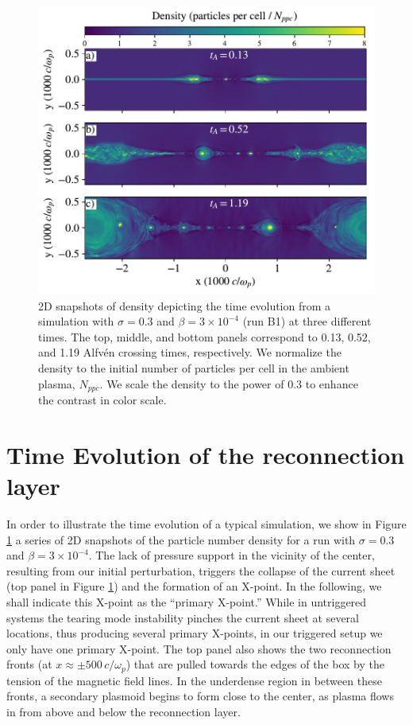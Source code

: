 \begin{figure}[!h]
\includegraphics[width=1.0\linewidth]{testing_threeplot.pdf}
\caption{2D snapshots of density depicting the time evolution from a simulation with $\sigma=0.3$ and $\beta=3\times 10^{-4}$ (run B1) at three different times.  The top, middle, and bottom panels correspond to 0.13, 0.52, and 1.19 Alfv\'en crossing times, respectively.  We normalize the density to the initial number of particles per cell in the ambient plasma, $N_{ppc}$.  We scale the density to the power of $0.3$ to enhance the contrast in color scale.}
\label{lowbeta_threeplot}
\end{figure}

\section{Time Evolution of the reconnection layer}\label{time_evol}
In order to illustrate the time evolution of a typical simulation, we show in Figure \ref{lowbeta_threeplot} a series of 2D snapshots of the particle number density for a run with $\sigma=0.3$ and $\beta=3\times10^{-4}$. The lack of pressure support in the vicinity of the center, resulting from our initial perturbation, triggers the collapse of the current sheet (top panel in Figure \ref{lowbeta_threeplot}) and the formation of an X-point. In the following, we shall indicate this X-point as the ``primary X-point.'' While in untriggered systems the tearing mode instability pinches the current sheet at several locations, thus producing several primary X-points, in our triggered setup we only have one primary X-point. The top panel also shows the two reconnection fronts (at $x \approx \pm 500\, c/\omega_{p}$) that are pulled towards the edges of the box by the tension of the magnetic field lines.  In the underdense region in between these fronts, a secondary plasmoid begins to form close to the center, as plasma flows in from above and below the  reconnection layer.  

